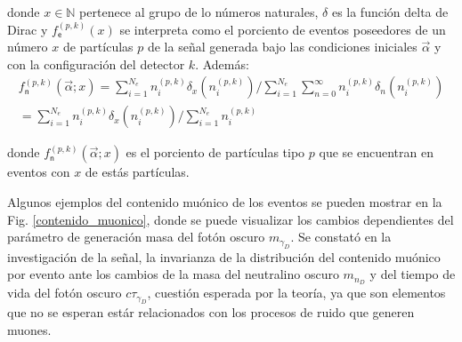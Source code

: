 donde $x\in\mathbb{N}$ pertenece al grupo de lo números naturales, $\delta$ es la función delta de Dirac y $f^{(p, k)}_\textsf{e} (x)$ se interpreta como el porciento de eventos poseedores de un número $x$ de partículas $p$ de la señal generada bajo las condiciones iniciales $\vec{\alpha}$ y con la configuración del detector $k$. Además:
\begin{eqnarray}\label{fn}
f^{(p, k)}_\textsf{n} (\vec{\alpha}; x) = \sum_{i=1}^{N_e} n_i^{(p,k)} \delta_{x}(n_i^{(p,k)})/\sum_{i=1}^{N_e} \sum_{n=0}^\infty n_i^{(p,k)} \delta_{n} (n_i^{(p,k)}) \nonumber\\
= \sum_{i=1}^{N_e} n_i^{(p,k)} \delta_{x}(n_i^{(p,k)})/\sum_{i=1}^{N_e} n_i^{(p,k)} ~~~~~~~~~~~~~~~~~~~~~
\end{eqnarray}


donde $f^{(p, k)}_\textsf{n} (\vec{\alpha}; x)$ es el porciento de partículas tipo $p$ que se encuentran en eventos con $x$ de estás partículas. 

Algunos ejemplos del contenido muónico de los eventos se pueden mostrar en la Fig. \ref{contenido_muonico}, donde se puede visualizar los cambios dependientes del parámetro de generación masa del fotón oscuro $m_{\gamma_D}$. Se constató en la investigación de la señal, la invarianza de la distribución del contenido muónico por evento ante los cambios de la masa del neutralino oscuro $m_{n_D}$ y del tiempo de vida del fotón oscuro $c \tau_{\gamma_D}$, cuestión esperada por la teoría, ya que son elementos que no se esperan estár relacionados con los procesos de ruido que generen muones.

